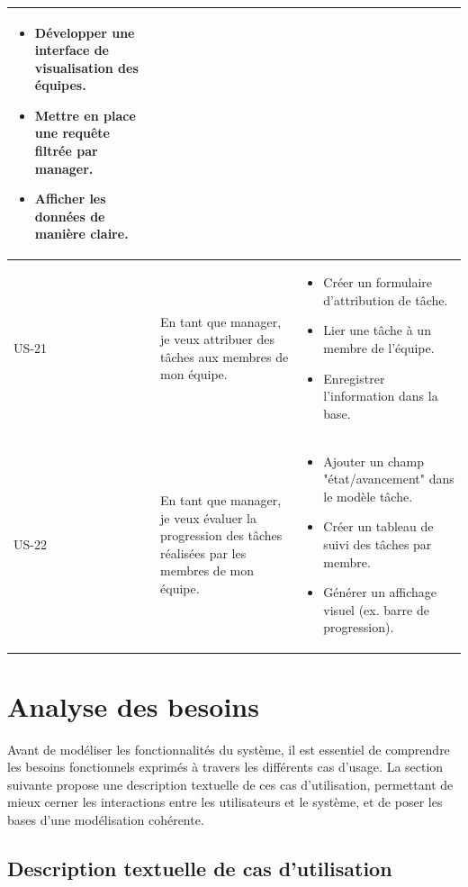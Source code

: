 {\begin{table}[H]
\begin{tabular}{|p{1cm}|p{8cm}|p{8cm}|}
\begin{itemize}[leftmargin=*]
  \item Développer une interface de visualisation des équipes.
  \item Mettre en place une requête filtrée par manager.
  \item Afficher les données de manière claire.
\end{itemize} \\
\hline
US-21 & En tant que manager, je veux attribuer des tâches aux membres de mon équipe. 
& 
\begin{itemize}[leftmargin=*]
  \item Créer un formulaire d'attribution de tâche.
  \item Lier une tâche à un membre de l’équipe.
  \item Enregistrer l'information dans la base.
\end{itemize} \\
\hline
US-22 & En tant que manager, je veux évaluer la progression des tâches réalisées par les membres de mon équipe. 
& 
\begin{itemize}[leftmargin=*]
  \item Ajouter un champ "état/avancement" dans le modèle tâche.
  \item Créer un tableau de suivi des tâches par membre.
  \item Générer un affichage visuel (ex. barre de progression).
\end{itemize} \\
\hline
\end{tabular}
\label{tab:sprint4_backlog}
\end{table}
}





\section{Analyse des besoins}
Avant de modéliser les fonctionnalités du système, il est essentiel de comprendre les besoins fonctionnels exprimés à travers les différents cas d’usage. La section suivante propose une description textuelle de ces cas d’utilisation, permettant de mieux cerner les interactions entre les utilisateurs et le système, et de poser les bases d’une modélisation cohérente.
    
\subsection{Description textuelle de cas d'utilisation}
   
